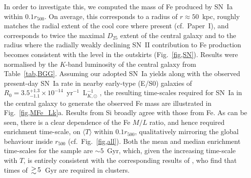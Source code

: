\documentclass[useAMS,usenatbib]{mn2e}
\begin{document}
In order to investigate this, we computed the mass of Fe produced by
SN~Ia within $0.1r_{500}$. On average, this corresponds to a radius of
$r\approx 50$~kpc, roughly matches the radial extent of the cool core
where present (cf.\ Paper~I), and corresponds to twice the maximal
$D_{25}$ extent of the central galaxy and to the radius where the
radially weakly declining SN~II contribution to Fe production becomes
consistent with the level in the outskirts (Fig.~\ref{fig,SN}).
Results were normalised by the $K$-band luminosity of the central
galaxy from Table~\ref{tab,BGG}. Assuming our adopted SN~Ia yields
along with the observed present-day SN~Ia rate in nearby early-type
(E/S0) galaxies of $R_0 = 3.5^{+1.3}_{-1.1}\times
10^{-14}$~yr$^{-1}$~L$_{K,\odot}^{-1}$ \citep{mann05}, the resulting
time-scales required for SN~Ia in the central galaxy to generate the
observed Fe mass are illustrated in Fig.~\ref{fig,MFe_Lk}a. Results
from Si broadly agree with those from Fe. As can be seen, there is a
clear dependence of the Fe $M/L$ ratio, and hence required enrichment
time-scale, on $\langle T \rangle$ within $0.1r_{500}$, qualitatively
mirroring the global behaviour inside $r_{500}$ (cf.\
Fig.~\ref{fig,all}). Both the mean and median enrichment time-scales
for the sample are $\sim 5$~Gyr, which, given the increasing
time-scale with $T$, is entirely consistent with the corresponding
results of \citet{boeh04}, who find that times of $\ga 5$~Gyr are
required in clusters.
\end{document}
